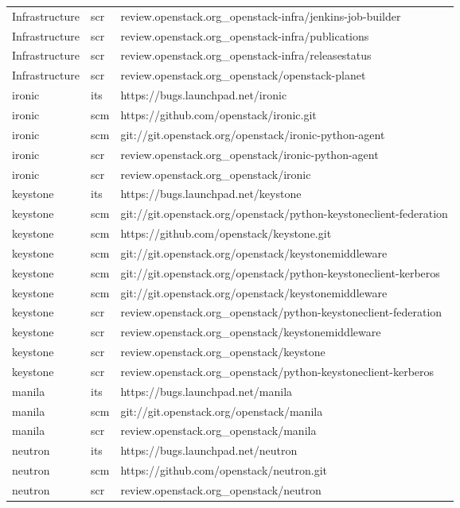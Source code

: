 \begin{center}
\begin{longtable}{|p{4cm}|p{1cm}|p{10cm}|}
Infrastructure&scr&review.openstack.org\_openstack-infra/jenkins-job-builder\\ 
Infrastructure&scr&review.openstack.org\_openstack-infra/publications\\ 
Infrastructure&scr&review.openstack.org\_openstack-infra/releasestatus\\ 
Infrastructure&scr&review.openstack.org\_openstack/openstack-planet\\ 
ironic&its&https://bugs.launchpad.net/ironic\\ 
ironic&scm&https://github.com/openstack/ironic.git\\ 
ironic&scm&git://git.openstack.org/openstack/ironic-python-agent\\ 
ironic&scr&review.openstack.org\_openstack/ironic-python-agent\\ 
ironic&scr&review.openstack.org\_openstack/ironic\\ 
keystone&its&https://bugs.launchpad.net/keystone\\ 
keystone&scm&git://git.openstack.org/openstack/python-keystoneclient-federation\\ 
keystone&scm&https://github.com/openstack/keystone.git\\ 
keystone&scm&git://git.openstack.org/openstack/keystonemiddleware\\ 
keystone&scm&git://git.openstack.org/openstack/python-keystoneclient-kerberos\\ 
keystone&scm&git://git.openstack.org/openstack/keystonemiddleware\\ 
keystone&scr&review.openstack.org\_openstack/python-keystoneclient-federation\\ 
keystone&scr&review.openstack.org\_openstack/keystonemiddleware\\ 
keystone&scr&review.openstack.org\_openstack/keystone\\ 
keystone&scr&review.openstack.org\_openstack/python-keystoneclient-kerberos\\ 
manila&its&https://bugs.launchpad.net/manila\\ 
manila&scm&git://git.openstack.org/openstack/manila\\ 
manila&scr&review.openstack.org\_openstack/manila\\ 
neutron&its&https://bugs.launchpad.net/neutron\\ 
neutron&scm&https://github.com/openstack/neutron.git\\ 
neutron&scr&review.openstack.org\_openstack/neutron\\ 

\end{longtable}
\end{center}
